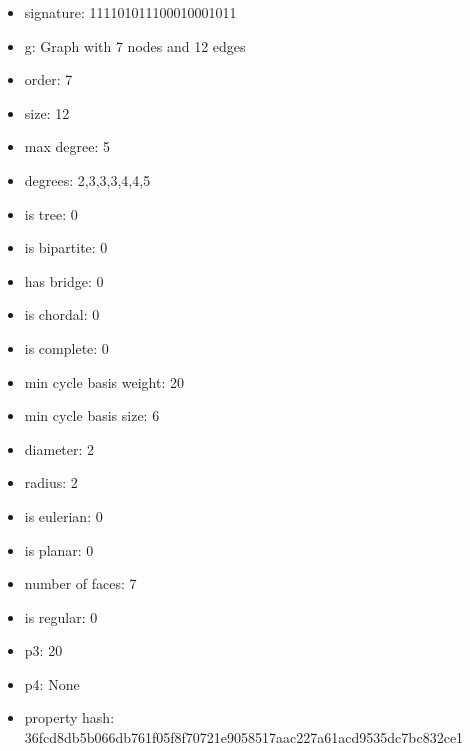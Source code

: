 \begin{itemize}
\item signature: 111101011100010001011
\item g: Graph with 7 nodes and 12 edges
\item order: 7
\item size: 12
\item max degree: 5
\item degrees: 2,3,3,3,4,4,5
\item is tree: 0
\item is bipartite: 0
\item has bridge: 0
\item is chordal: 0
\item is complete: 0
\item min cycle basis weight: 20
\item min cycle basis size: 6
\item diameter: 2
\item radius: 2
\item is eulerian: 0
\item is planar: 0
\item number of faces: 7
\item is regular: 0
\item p3: 20
\item p4: None
\item property hash: 36fcd8db5b066db761f05f8f70721e9058517aac227a61acd9535dc7bc832ce1
\end{itemize}
\newpage
\begin{figure}
\end{figure}
